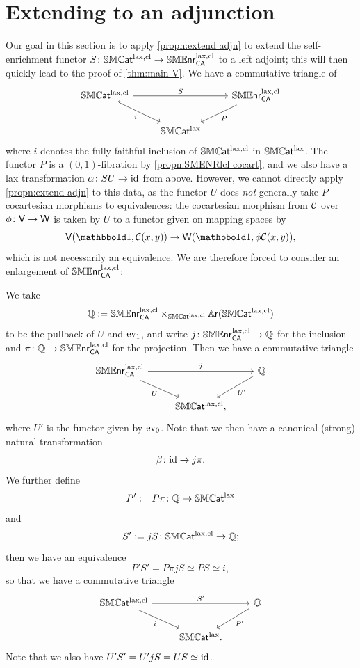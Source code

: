 \documentclass[a4paper,11pt]{article}
\newcommand{\SMENRlc}{\SMENR^{\lax,\cl}_{\CA}}
\begin{document}
\section{Extending to an adjunction}\label{sec:extend adjn}
Our goal in this section is to apply
\cref{propn:extend adjn} to extend the self-enrichment functor $S
\colon \SMCATlcl \to \SMENRlc$ to a left adjoint; this will then
quickly lead to the proof of \cref{thm:main V}. We have a commutative triangle of \itcats{}
\[
  \begin{tikzcd}
    \SMCATlcl \ar[rr, "S"] \ar[dr, hookrightarrow, "i"'] & & 
    \SMENR^{\lax,\cl}_{\CA} \ar[dl, "P"] \\
     & \SMCATl
  \end{tikzcd}
\]
where $i$ denotes the fully faithful inclusion of
$\mathbb{SMC}\mkern-0.5mu\textsf{\textup{at}}^{\text{\textup{lax}},\text{\textup{cl}}}$ in $\mathbb{SMC}\mkern-0.5mu\textsf{\textup{at}}^{\text{\textup{lax}}}$. The functor $P$ is a $(0,1)$-fibration by
\cref{propn:SMENRlcl cocart}, and we also have a lax transformation
$\alpha \colon SU \to \id$ from above. However, we cannot directly
apply \cref{propn:extend adjn} to this data, as the functor $U$ does
\emph{not} generally take $P$-cocartesian morphisms to equivalences:
the cocartesian morphism from $\mathcal{C}$ over $\phi \colon \uV \to \uW$ is
taken by $U$ to a functor given on mapping spaces by
\[ \uV(\bbone, \eC(x,y)) \to \uW(\bbone, \phi \eC(x,y)), \]
which is not necessarily an equivalence. We are therefore forced to
consider an enlargement of $\SMENRlc$:
\begin{defn}
  We take
  \[ \tQ := \SMENRlc \times_{\SMCATlcl} \AR(\SMCATlcl) \]
  to be the pullback of $U$ and $\text{\textup{ev}}_{1}$, and write $j \colon
  \SMENRlc \to \tQ$ for the inclusion and $\pi \colon \tQ \to
  \SMENRlc$ for the projection. Then we have a commutative triangle
  \[
    \begin{tikzcd}
     \SMENRlc \ar[rr, "j"] \ar[dr, "U"'] & & \tQ \ar[dl, "U'"] \\
      & \SMCATlcl,
    \end{tikzcd}
  \]
  where $U'$ is the functor given by $\text{\textup{ev}}_{0}$.  Note that we then
  have a canonical (strong) natural transformation
  \[\beta \colon \id \to j \pi.\] We further define
  \[P' := P \pi \colon \tQ \to \SMCATl\] and
  \[S' := jS \colon \SMCATlcl \to \tQ;\] then we have an equivalence
  \[ P'S' = P \pi j S \simeq P S \simeq i,\]
  so that we have a commutative triangle
  \[
    \begin{tikzcd}
     \SMCATlcl \ar[rr, "S'"] \ar[dr, "i"'] & & \tQ \ar[dl, "P'"] \\
      & \SMCATl.
    \end{tikzcd}
  \]
  Note that we also have $U'S' = U'jS = US \simeq \text{\textup{id}}$.
\end{defn}
\end{document}

